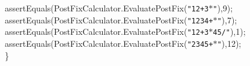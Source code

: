 {{\begin{tabbing}
\makebox[48pt][l]{}\makebox[48pt][l]{}assertEquals(PostFixCalculator.EvaluatePostFix({\texttt{\string"1\hspace{6pt}2\hspace{6pt}+\hspace{6pt}3\hspace{6pt}$\ast$\string"}}),\hspace{6pt}9);\\
\makebox[48pt][l]{}\makebox[48pt][l]{}assertEquals(PostFixCalculator.EvaluatePostFix({\texttt{\string"1\hspace{6pt}2\hspace{6pt}\dash{}\hspace{6pt}3\hspace{6pt}4\hspace{6pt}+\hspace{6pt}$\ast$\string"}}),\hspace{6pt}\dash{}7);\\
\makebox[48pt][l]{}\makebox[48pt][l]{}assertEquals(PostFixCalculator.EvaluatePostFix({\texttt{\string"1\hspace{6pt}2\hspace{6pt}+\hspace{6pt}3\hspace{6pt}$\ast$\hspace{6pt}4\hspace{6pt}\dash{}\hspace{6pt}5\hspace{6pt}/\string"}}),\hspace{6pt}1);\\
\makebox[48pt][l]{}\makebox[48pt][l]{}assertEquals(PostFixCalculator.EvaluatePostFix({\texttt{\string"2\hspace{6pt}3\hspace{6pt}4\hspace{6pt}5\hspace{6pt}+\hspace{6pt}\dash{}\hspace{6pt}$\ast$\string"}}),\hspace{6pt}\dash{}12);\\
\makebox[48pt][l]{}\}\\
\\
\makebox[48pt][l]{}{\it{/$\ast$$\ast$}}\\
\\

\end{tabbing}}}
